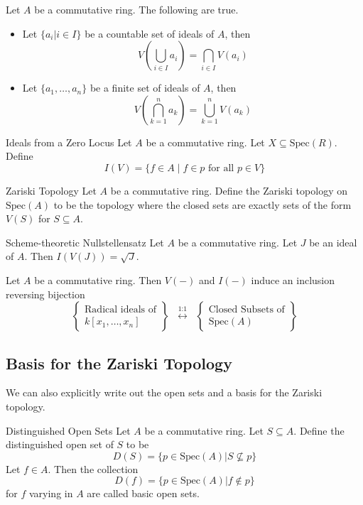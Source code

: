 \documentclass[a4paper]{article}
\begin{document}
\begin{lmm}{}{} Let $A$ be a commutative ring. The following are true. 
\begin{itemize}
\item Let $\{a_i|i\in I\}$ be a countable set of ideals of $A$, then $$V\left(\bigcup_{i\in I}a_i\right)=\bigcap_{i\in I}V(a_i)$$
\item Let $\{a_1,\dots,a_n\}$ be a finite set of ideals of $A$, then $$V\left(\bigcap_{k=1}^na_k\right)=\bigcup_{k=1}^nV(a_k)$$
\end{itemize}
\end{lmm}

\begin{defn}{Ideals from a Zero Locus}{} Let $A$ be a commutative ring. Let $X\subseteq\text{Spec}(R)$. Define $$I(V)=\{f\in A\;|\;f\in p\text{ for all }p\in V\}$$
\end{defn}

\begin{defn}{Zariski Topology}{} Let $A$ be a commutative ring. Define the Zariski topology on $\text{Spec}(A)$ to be the topology where the closed sets are exactly sets of the form $V(S)$ for $S\subseteq A$. 
\end{defn}

\begin{thm}{Scheme-theoretic Nullstellensatz}{} Let $A$ be a commutative ring. Let $J$ be an ideal of $A$. Then $I(V(J))=\sqrt{J}$. 
\end{thm}

\begin{crl}{}{} Let $A$ be a commutative ring. Then $V(-)$ and $I(-)$ induce an inclusion reversing bijection $$\left\{\substack{\text{Radical ideals of}\\ k[x_1,\dots,x_n]}\right\}\;\;\overset{\text{1:1}}{\longleftrightarrow}\;\;\left\{\substack{\text{Closed Subsets of}\\\text{Spec}(A)}\right\}$$
\end{crl}

\subsection{Basis for the Zariski Topology}
We can also explicitly write out the open sets and a basis for the Zariski topology. 

\begin{defn}{Distinguished Open Sets}{} Let $A$ be a commutative ring. Let $S\subseteq A$. Define the distinguished open set of $S$ to be $$D(S)=\{p\in\text{Spec}(A)|S\not\subseteq p\}$$ Let $f\in A$. Then the collection $$D(f)=\{p\in\text{Spec}(A)|f\notin p\}$$ for $f$ varying in $A$ are called basic open sets. 
\end{defn}
\end{document}
